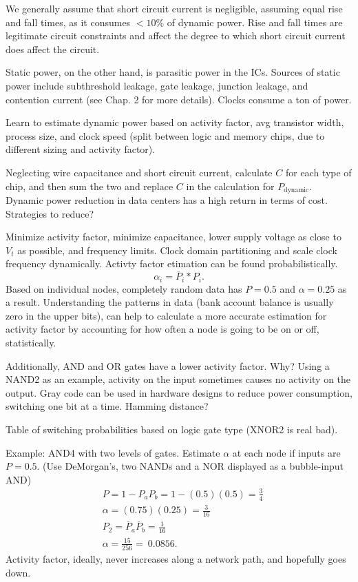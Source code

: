 \documentclass{article}
\begin{document}
We generally assume that short circuit current is negligible, assuming equal rise and fall times, as it consumes \(<10\%\) of dynamic power. Rise and fall times are legitimate circuit constraints and affect the degree to which short circuit current does affect the circuit. 

Static power, on the other hand, is parasitic power in the ICs. Sources of static power include subthreshold leakage, gate leakage, junction leakage, and contention current (see Chap. 2 for more details). Clocks consume a ton of power. 

Learn to estimate dynamic power based on activity factor, avg transistor width, process size, and clock speed (split between logic and memory chips, due to different sizing and activity factor).

Neglecting wire capacitance and short circuit current, calculate \(C\) for each type of chip, and then sum the two and replace \(C\) in the calculation for \(P_{\mathrm{dynamic}}\). Dynamic power reduction in data centers has a high return in terms of cost. Strategies to reduce? 

Minimize activity factor, minimize capacitance, lower supply voltage as close to \(V_{t}\) as possible, and frequency limits. Clock domain partitioning and scale clock frequency dynamically. Activty factor etimation can be found probabilistically. 
\[
	\alpha_i = \overline{P}_i * P_i.
\]
Based on individual nodes, completely random data has \(P=0.5\) and \(\alpha = 0.25\) as a result. Understanding the patterns in data (bank account balance is usually zero in the upper bits), can help to calculate a more accurate estimation for activity factor by accounting for how often a node is going to be on or off, statistically. 

Additionally, AND and OR gates have a lower activity factor. Why? Using a NAND2 as an example, activity on the input sometimes causes no activity on the output. Gray code can be used in hardware designs to reduce power consumption, switching one bit at a time. Hamming distance? 

Table of switching probabilities based on logic gate type (XNOR2 is real bad). 

Example: AND4 with two levels of gates. Estimate \(\alpha\) at each node if inputs are \(P=0.5\). (Use DeMorgan's, two NANDs and a NOR displayed as a bubble-input AND)
\begin{align*}
  &P = 1-P_aP_b = 1-(0.5)(0.5) = \frac{3}{4} \\
	&\alpha = (0.75)(0.25) = \frac{3}{16} \\
  &P_2 = \overline{P}_a \overline{P}_b = \frac{1}{16}\\
	&\alpha = \frac{15}{256} = ~0.0856.
\end{align*}
Activity factor, ideally, never increases along a network path, and hopefully goes down.
\end{document}
